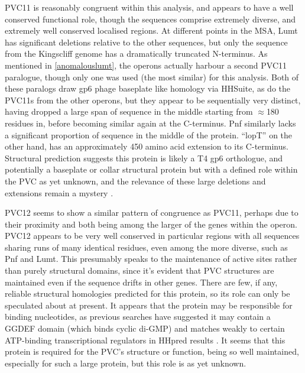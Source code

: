 PVC11 is reasonably congruent within this analysis, and appears to have a well conserved functional role, though the sequences comprise extremely diverse, and extremely well conserved localised regions. At different points in the MSA, Lumt has significant deletions relative to the other sequences, but only the sequence from the Kingscliff genome has a dramatically truncated N-terminus. As mentioned in \vref{anomalouslumt}, the operons actually harbour a second PVC11 paralogue, though only one was used (the most similar) for this analysis. Both of these paralogs draw gp6 phage baseplate like homology via HHSuite, as do the PVC11s from the other operons, but they appear to be sequentially very distinct, having dropped a large span of sequence in the middle starting from $\approx$180 residues in, before becoming similar again at the C-terminus. Pnf similarly lacks a significant proportion of sequence in the middle of the protein. ``lopT'' on the other hand, has an approximately 450 amino acid extension to its C-terminus. Structural prediction suggests this protein is likely a T4 gp6 orthologue, and potentially a baseplate or collar structural protein but with a defined role within the PVC as yet unknown, and the relevance of these large deletions and extensions remain a mystery \citep{Cardarelli2010, Aksyuk2009a}.

PVC12 seems to show a similar pattern of congruence as PVC11, perhaps due to their proximity and both being among the larger of the genes within the operon. PVC12 appears to be very well conserved in particular regions with all sequences sharing runs of many identical residues, even among the more diverse, such as Pnf and Lumt. This presumably speaks to the maintenance of active sites rather than purely structural domains, since it's evident that PVC structures are maintained even if the sequence drifts in other genes. There are few, if any, reliable structural homologies predicted for this protein, so its role can only be speculated about at present. It appears that the protein may be responsible for binding nucleotides, as previous searches have suggested it may contain a GGDEF domain (which binds cyclic di-GMP) and matches weakly to certain ATP-binding transcriptional regulators in HHpred results \citep{Paul2004}. It seems that this protein is required for the PVC's structure or function, being so well maintained, especially for such a large protein, but this role is as yet unknown.

